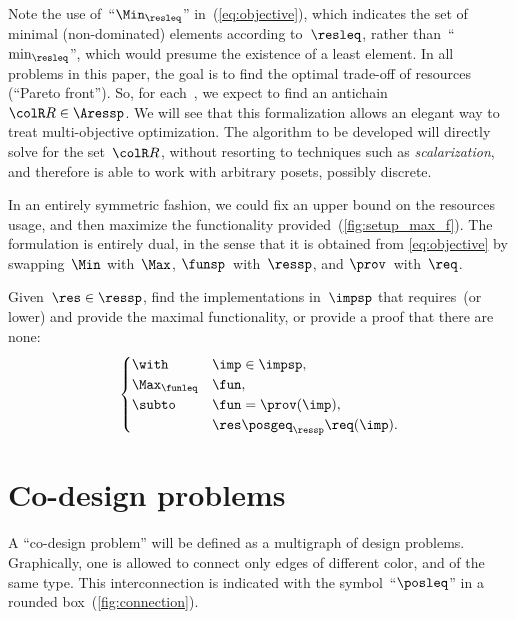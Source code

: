 \begin{remark}
  Note the use of~``$\Min_{\resleq}$'' in~(\ref{eq:objective}),
  which indicates the set of minimal (non-dominated) elements according
  to~$\resleq$, rather than~``$\min_{\resleq}$'', which would
  presume the existence of a least element. In all problems in this
  paper, the goal is to find the optimal trade-off of resources (``Pareto
  front''). So, for each~\fun, we expect to find an antichain~${\colR R}\in\Aressp$.
  We will see that this formalization allows an elegant way to treat
  multi-objective optimization. The algorithm to be developed will directly
  solve for the set~${\colR R}$, without resorting to techniques such
  as \emph{scalarization}, and therefore is able to work with arbitrary
  posets, possibly discrete.
\end{remark}


In an entirely symmetric fashion, we could fix an upper bound on
the resources usage, and then maximize the functionality provided~(\cref{fig:setup_max_f}).
The formulation is entirely dual, in the sense that it is obtained
from \cref{eq:objective} by swapping~$\Min$ with~$\Max$, $\funsp$~with~$\ressp$,
and $\prov$~with~$\req$.

\begin{problem}[FixResMinFun]
  Given~$\res\in\ressp$, find the implementations
  in~$\impsp$ that requires~\res (or lower)
  and provide the maximal functionality, or provide a proof that there are none:
  \begin{equation}
    \begin{cases}
      \with & \imp\in\impsp,\\
      \Max_{\funleq} & \fun,\\
      \subto & \fun=\prov(\imp),\\
      & \res\posgeq_{\ressp}\req(\imp).
    \end{cases}\label{eq:objective-1}
  \end{equation}
\end{problem}


\section{Co-design problems\label{sec:Co-design-problems}}

A ``co-design problem'' will be defined as a multigraph of design
problems. Graphically, one is allowed to connect only edges of different
color, and of the same type. This interconnection is indicated with the symbol~``$\posleq$''
in a rounded box~(\cref{fig:connection}).


